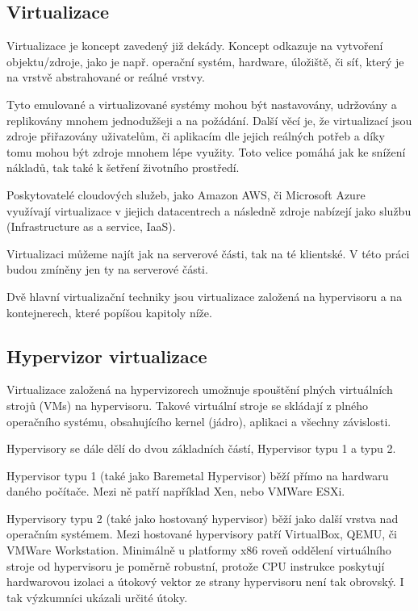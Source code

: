 \documentclass[thesis=M,czech]{FITthesis}[2019/12/23]
\theoremstyle{plain}
\theoremstyle{definition}
\begin{document}
\subsection{Virtualizace}

Virtualizace je koncept zavedený již dekády. Koncept odkazuje na vytvoření objektu/zdroje, jako je např. operační systém, hardware, úložiště, či síť, který je na vrstvě abstrahované or reálné vrstvy.

Tyto emulované a virtualizované systémy mohou být nastavovány, udržovány a replikovány mnohem jednodužšeji a na požádání. Další věcí je, že virtualizací jsou zdroje přiřazovány uživatelům, či aplikacím dle jejich reálných potřeb a díky tomu mohou být zdroje mnohem lépe využity. Toto velice pomáhá jak ke snížení nákladů, tak také k šetření životního prostředí. 

Poskytovatelé cloudových služeb, jako Amazon AWS, či Microsoft Azure využívají virtualizace v jiejich datacentrech a následně zdroje nabízejí jako službu (Infrastructure as a service, IaaS). 


Virtualizaci můžeme najít jak na serverové části, tak na té klientské. V této práci budou zmíněny jen ty na serverové části.

Dvě hlavní virtualizační techniky jsou virtualizace založená na hypervisoru a na kontejnerech, které popíšou kapitoly níže.

\subsection{Hypervizor virtualizace}

Virtualizace založená na hypervizorech umožnuje spouštění plných virtuálních strojů (VMs) na hypervisoru. Takové virtuální stroje se skládají z plného operačního systému, obsahujícího kernel (jádro), aplikaci a všechny závislosti. \cite{virt-comparison}


Hypervisory se dále dělí do dvou základních částí, Hypervisor typu 1 a typu 2.

Hypervisor typu 1 (také jako Baremetal Hypervisor) běží přímo na hardwaru daného počítače. Mezi ně patří například Xen, nebo  VMWare ESXi. 

Hypervisory typu 2 (také jako hostovaný hypervisor) běží jako další vrstva nad operačním systémem. Mezi hostované hypervisory patří VirtualBox, QEMU, či VMWare Workstation. Minimálně u platformy x86 roveň oddělení virtuálního stroje od hypervisoru je poměrně robustní, protože CPU instrukce poskytují hardwarovou izolaci a útokový vektor ze strany hypervisoru není tak obrovský. I tak výzkumníci ukázali určité útoky.  
\end{document}
